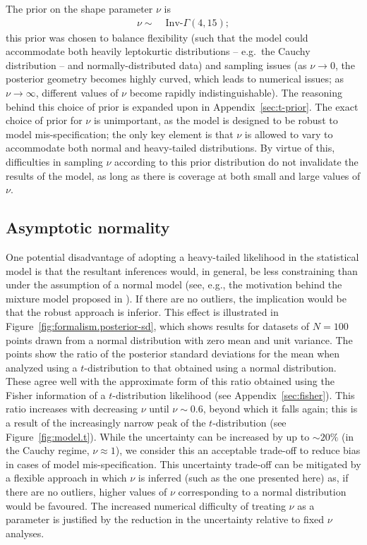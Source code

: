 \documentclass[fleqn,usenatbib]{rasti}
\begin{document}
The prior on the shape parameter $\nu$ is
\begin{align}
    \nu \sim&\; \text{Inv-}\Gamma(4, 15);
\end{align}
this prior was chosen to balance flexibility (such that the model could
accommodate both heavily leptokurtic distributions -- e.g.\ the Cauchy
distribution -- and normally-distributed data) and sampling issues (as $\nu
\rightarrow 0$, the posterior geometry becomes highly curved, which leads to
numerical issues; as $\nu \rightarrow \infty$, different values of $\nu$ become
rapidly indistinguishable). The reasoning behind this choice of prior is
expanded upon in Appendix~\ref{sec:t-prior}. The exact choice of prior for $\nu$
is unimportant, as the model is designed to be robust to model
mis-specification; the only key element is that $\nu$ is allowed to vary to
accommodate both normal and heavy-tailed distributions. By virtue of this,
difficulties in sampling $\nu$ according to this prior distribution do not
invalidate the results of the model, as long as there is coverage at both small
and large values of $\nu$.

\subsection{Asymptotic normality}
\label{sec:formalism.asymptotic}

One potential disadvantage of adopting a heavy-tailed likelihood in the
statistical model is that the resultant inferences would, in general, be less
constraining than under the assumption of a normal model (see, e.g., the
motivation behind the mixture model proposed in \citealt{Tak:2019}).  If there
are no outliers, the implication would be that the robust approach is inferior.
This effect is illustrated in Figure~\ref{fig:formalism.posterior-sd}, which
shows results for datasets of $N=100$ points drawn from a normal distribution
with zero mean and unit variance. The points show the ratio of the posterior
standard deviations for the mean when analyzed using a $t$-distribution to that
obtained using a normal distribution. These agree well with the approximate form
of this ratio obtained using the Fisher information of a $t$-distribution
likelihood (see Appendix~\ref{sec:fisher}). This ratio increases with decreasing
$\nu$ until $\nu \sim 0.6$, beyond which it falls again; this is a result of the
increasingly narrow peak of the $t$-distribution (see Figure~\ref{fig:model.t}).
While the uncertainty can be increased by up to $\sim20\%$ (in the Cauchy
regime, $\nu \approx 1$), we consider this an acceptable trade-off to reduce
bias in cases of model mis-specification.  This uncertainty trade-off can be
mitigated by a flexible approach in which $\nu$ is inferred (such as the one
presented here) as, if there are no outliers, higher values of $\nu$
corresponding to a normal distribution would be favoured.  The increased
numerical difficulty of treating $\nu$ as a parameter is justified by the
reduction in the uncertainty relative to fixed $\nu$ analyses.
\end{document}
